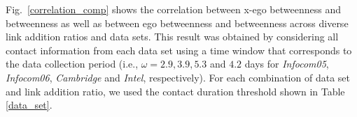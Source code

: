 Fig.~\ref{correlation_comp} shows the correlation between x-ego betweenness and betweenness as well as between ego betweenness and betweenness across diverse link addition ratios and data sets.
This result was obtained by considering all contact information from each data set using a time window that corresponds to the data collection period (i.e., $\omega = 2.9, 3.9, 5.3$ and $4.2$ days for {\em Infocom05}, {\em Infocom06},  {\it Cambridge} and {\it Intel}, respectively).
For each combination of data set and link addition ratio, we used the contact duration threshold shown in Table \ref{data_set}. 

